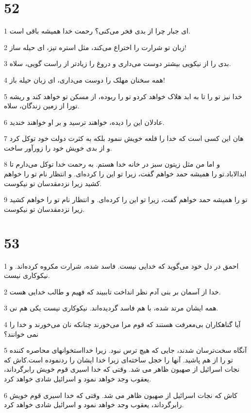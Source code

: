 \chapter{52}

\par 1 ای جبار چرا از بدی فخر می‌کنی؟ رحمت خدا همیشه باقی است.
\par 2 زبان تو شرارت را اختراع می‌کند، مثل استره تیز، ای حیله ساز!
\par 3 بدی را از نیکویی بیشتر دوست می‌داری و دروغ را زیادتر از راست گویی، سلاه.
\par 4 همه سخنان مهلک را دوست می‌داری، ای زبان حیله باز!
\par 5 خدا نیز تو را تا به ابد هلاک خواهد کردو تو را ربوده، از مسکن تو خواهد کند و ریشه تورا از زمین زندگان، سلاه.
\par 6 عادلان این را دیده، خواهند ترسید و بر او خواهند خندید.
\par 7 هان این کسی است که خدا را قلعه خویش ننمود بلکه به کثرت دولت خود توکل کرد و از بدی خویش خود را زورآور ساخت.
\par 8 و اما من مثل زیتون سبز در خانه خدا هستم. به رحمت خدا توکل می‌دارم تا ابدالاباد.تو را همیشه حمد خواهم گفت، زیرا تو این را کرده‌ای. و انتظار نام تو را خواهم کشید زیرا نزدمقدسان تو نیکوست.
\par 9 تو را همیشه حمد خواهم گفت، زیرا تو این را کرده‌ای. و انتظار نام تو را خواهم کشید زیرا نزدمقدسان تو نیکوست.
 
\chapter{53}

\par 1 احمق در دل خود می‌گوید که خدایی نیست. فاسد شده، شرارت مکروه کرده‌اند. و نیکوکاری نیست.
\par 2 خدا از آسمان بر بنی آدم نظر انداخت تاببیند که فهیم و طالب خدایی هست.
\par 3 همه ایشان مرتد شده، با هم فاسد گردیده‌اند. نیکوکاری نیست یکی هم نی.
\par 4 آیا گناهکاران بی‌معرفت هستند که قوم مرا می‌خورند چنانکه نان می‌خورند و خدا را نمی خوانند؟
\par 5 آنگاه سخت‌ترسان شدند، جایی که هیچ ترس نبود. زیرا خدااستخوانهای محاصره کننده تو را از هم پاشید. آنها را خجل ساخته‌ای زیرا خدا ایشان را ردنموده است.کاش که نجات اسرائیل از صهیون ظاهر می شد. وقتی که خدا اسیری قوم خویش رابرگرداند، یعقوب وجد خواهد نمود و اسرائیل شادی خواهد کرد.
\par 6 کاش که نجات اسرائیل از صهیون ظاهر می شد. وقتی که خدا اسیری قوم خویش رابرگرداند، یعقوب وجد خواهد نمود و اسرائیل شادی خواهد کرد.
 
